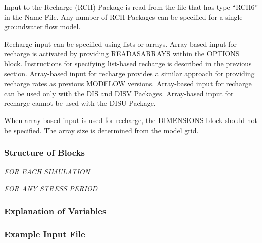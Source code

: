 
Input to the Recharge (RCH) Package is read from the file that has type ``RCH6'' in the Name File.  Any number of RCH Packages can be specified for a single groundwater flow model.

Recharge input can be specified using lists or arrays.  Array-based input for recharge is activated by providing READASARRAYS within the OPTIONS block.   Instructions for specifying list-based recharge is described in the previous section.  Array-based input for recharge provides a similar approach for providing recharge rates as previous MODFLOW versions.  Array-based input for recharge can be used only with the DIS and DISV Packages.  Array-based input for recharge cannot be used with the DISU Package.

When array-based input is used for recharge, the DIMENSIONS block should not be specified.  The array size is determined from the model grid. 

\vspace{5mm}
\subsubsection{Structure of Blocks}
\vspace{5mm}

\noindent \textit{FOR EACH SIMULATION}

\vspace{5mm}
\noindent \textit{FOR ANY STRESS PERIOD}

\packageperioddescription

\vspace{5mm}
\subsubsection{Explanation of Variables}
\begin{description}

\end{description}

\vspace{5mm}
\subsubsection{Example Input File}



